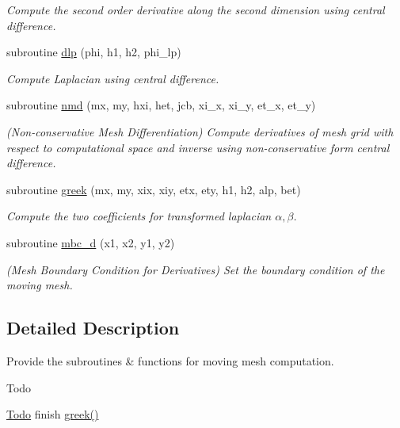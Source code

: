 \begin{DoxyCompactItemize}
\begin{DoxyCompactList}\small\item\em Compute the second order derivative along the second dimension using central difference. \end{DoxyCompactList}\item 
subroutine \hyperlink{namespacemirana_a353bce8a93046cd8fd25021634d6503e}{dlp} (phi, h1, h2, phi\+\_\+lp)
\begin{DoxyCompactList}\small\item\em Compute Laplacian using central difference. \end{DoxyCompactList}\item 
subroutine \hyperlink{namespacemirana_a53c223d4530275ef3fc6a5820f5b0990}{nmd} (mx, my, hxi, het, jcb, xi\+\_\+x, xi\+\_\+y, et\+\_\+x, et\+\_\+y)
\begin{DoxyCompactList}\small\item\em (Non-\/conservative Mesh Differentiation) Compute derivatives of mesh grid with respect to computational space and inverse using non-\/conservative form central difference. \end{DoxyCompactList}\item 
subroutine \hyperlink{namespacemirana_a7530ea2e7b2dfe85f3a088d24de59f1d}{greek} (mx, my, xix, xiy, etx, ety, h1, h2, alp, bet)
\begin{DoxyCompactList}\small\item\em Compute the two coefficients for transformed laplacian $\alpha,\beta$. \end{DoxyCompactList}\item 
subroutine \hyperlink{namespacemirana_a65a514d206d0e8ae53253938d2aff553}{mbc\+\_\+d} (x1, x2, y1, y2)
\begin{DoxyCompactList}\small\item\em (Mesh Boundary Condition for Derivatives) Set the boundary condition of the moving mesh. \end{DoxyCompactList}\end{DoxyCompactItemize}


\subsection{Detailed Description}
Provide the subroutines \& functions for moving mesh computation. 

\begin{DoxyRefDesc}{Todo}
\item[\hyperlink{todo__todo000001}{Todo}]finish \hyperlink{namespacemirana_a7530ea2e7b2dfe85f3a088d24de59f1d}{greek()} \end{DoxyRefDesc}


